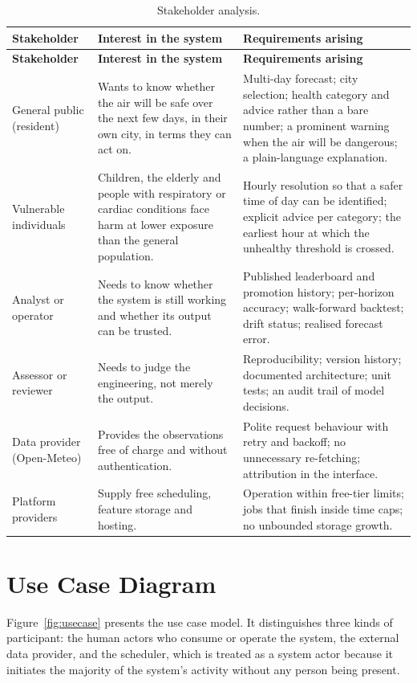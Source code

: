 \begin{xltabular}{\textwidth}{P{2.9cm} P{4.4cm} Y}
\caption{Stakeholder analysis.}\label{tab:stakeholders}\\
\toprule
\bfseries Stakeholder & \bfseries Interest in the system & \bfseries Requirements arising \\
\midrule
\endfirsthead
\toprule
\bfseries Stakeholder & \bfseries Interest in the system & \bfseries Requirements arising \\
\midrule
\endhead
\bottomrule
\endlastfoot
General public (resident) & Wants to know whether the air will be safe over the
next few days, in their own city, in terms they can act on. & Multi-day forecast;
city selection; health category and advice rather than a bare number; a
prominent warning when the air will be dangerous; a plain-language explanation. \\
Vulnerable individuals & Children, the elderly and people with respiratory or
cardiac conditions face harm at lower exposure than the general population. &
Hourly resolution so that a safer time of day can be identified; explicit advice
per category; the earliest hour at which the unhealthy threshold is crossed. \\
Analyst or operator & Needs to know whether the system is still working and
whether its output can be trusted. & Published leaderboard and promotion history;
per-horizon accuracy; walk-forward backtest; drift status; realised forecast
error. \\
Assessor or reviewer & Needs to judge the engineering, not merely the output. &
Reproducibility; version history; documented architecture; unit tests; an audit
trail of model decisions. \\
Data provider (Open-Meteo) & Provides the observations free of charge and without
authentication. & Polite request behaviour with retry and backoff; no
unnecessary re-fetching; attribution in the interface. \\
Platform providers & Supply free scheduling, feature storage and hosting. &
Operation within free-tier limits; jobs that finish inside time caps; no
unbounded storage growth. \\
\end{xltabular}

\section{Use Case Diagram}
Figure~\ref{fig:usecase} presents the use case model. It distinguishes three
kinds of participant: the human actors who consume or operate the system, the
external data provider, and the scheduler, which is treated as a system actor
because it initiates the majority of the system's activity without any person
being present.

